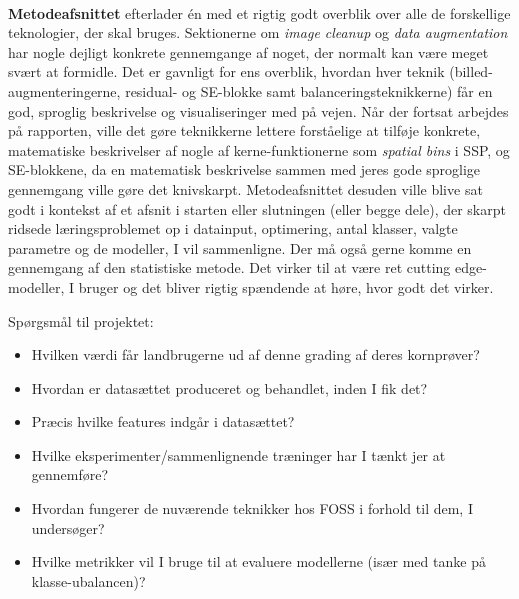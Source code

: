 \documentclass[12pt,fleqn,]{article}
\begin{document}
\\
\textbf{Metodeafsnittet} efterlader én med et rigtig godt overblik over alle de forskellige teknologier, der skal bruges. Sektionerne om \textit{image cleanup} og \textit{data augmentation} har nogle dejligt konkrete gennemgange af noget, der normalt kan være meget svært at formidle. Det er gavnligt for ens overblik, hvordan hver teknik (billed-augmenteringerne, residual- og SE-blokke samt balanceringsteknikkerne) får en god, sproglig beskrivelse og visualiseringer med på vejen. Når der fortsat arbejdes på rapporten, ville det gøre teknikkerne lettere forståelige at tilføje konkrete, matematiske beskrivelser af nogle af kerne-funktionerne som \textit{spatial bins} i SSP, og SE-blokkene, da en matematisk beskrivelse sammen med jeres gode sproglige gennemgang ville gøre det knivskarpt. Metodeafsnittet desuden ville blive sat godt i kontekst af et afsnit i starten eller slutningen (eller begge dele), der skarpt ridsede læringsproblemet op i datainput, optimering, antal klasser, valgte parametre og de modeller, I vil sammenligne. Der må også gerne komme en gennemgang af den statistiske metode. Det virker til at være ret cutting edge-modeller, I bruger og det bliver rigtig spændende at høre, hvor godt det virker. 
\

Spørgsmål til projektet:
\begin{itemize}

\item Hvilken værdi får landbrugerne ud af denne grading af deres kornprøver? 
\item Hvordan er datasættet produceret og behandlet, inden I fik det?
\item Præcis hvilke features indgår i datasættet?   
\item Hvilke eksperimenter/sammenlignende træninger har I tænkt jer at gennemføre?
\item Hvordan fungerer de nuværende teknikker hos FOSS i forhold til dem, I undersøger?
\item Hvilke metrikker vil I bruge til at evaluere modellerne (især med tanke på klasse-ubalancen)?

\end{itemize}
\end{document}
